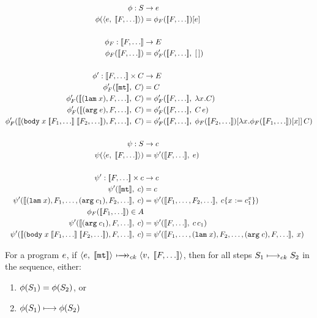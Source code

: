 \documentclass{article}
\begin{document}
\begin{align*}
  \phi : \St &\rightarrow \e \\
  \build{\ckeFs} &= \inhole{\buildF{\Fss}}{\e} \\ \\
  \phi_F : \Fss &\rightarrow \E \\
  \buildF{\Fss} &= \buildFhelp{\Fss}{\hole} \\ \\
  \phi' : \Fss \times \C &\rightarrow \E \\
  \buildFhelp{\mkFlst{\mt}}{\C} &= \C \\
  \buildFhelpLHS{\lxF} &= \buildFhelpRHS{\lx\C} \\
  \buildFhelpLHS{\argFe} &= \buildFhelpRHS{\ap{\C}{\e}} \\
  \buildFhelpLHS{\bodyFx{\Fss[_1]}{\Fss[_2]}} &= 
  \buildFhelpRHS{\ap{\inhole{\buildF{\Fss[_2]}}
                            {\lx\inhole{\buildF{\Fss[_1]}}
                                       {x}}}
                    {\C}} \\ \\
  \psi : \St &\rightarrow \stepe \\
  \buildtostep{\ckeFs} &= \buildtostepp{\Fss}{\e} \\ \\
  \psi' : \Fss \times \stepe &\rightarrow \stepe \\
  \buildtostepp{\mkFlst{\mt}}{\stepe} &= \stepe \\
  \buildtostepp{\appendFss{\consFs[_1]{\lxF}}
                          {\consFs[_2]{\argF{\stepe_1}}}}
               {\stepe}
     &=
  \buildtostepp{\appendFss{\Fs[_1]}{\Fs[_2]}}
               {\substx{\stepe}{\labx{\stepe_1}}} \\
    \buildF{\Fss[_1]} \in \A \\
  \buildtostepp{\consFss{\argF{\stepe_1}}}{\stepe}
    &=
  \buildtostepp{\Fss}{\ap{\stepe}{\stepe_1}} \\
  \buildtostepp{\consFss{\bodyFx{\Fss[_1]}{\Fss[_2]}}}{\stepe}
    &=
  \buildtostepp{\appendFss{\Fs[_1]}
                          {\appendFs{\consFs[_2]{\lxF}}
                                    {\consFs{\argF{\stepe}}}}}
               {x}
\end{align*}




\newpage


\begin{theorem}
For a program $e$, if $\ck{\e}{\mtFss} \cksteps \ck{\val}{\Fss}$, then for all
steps $S_1 \longmapsto_{ck} S_2$ in the sequence, either:
\begin{enumerate}
  \item $\phi(S_1) = \phi(S_2)$, or
  \item $\phi(S_1) \longmapsto \phi(S_2)$
\end{enumerate}

\end{theorem}
\end{document}
